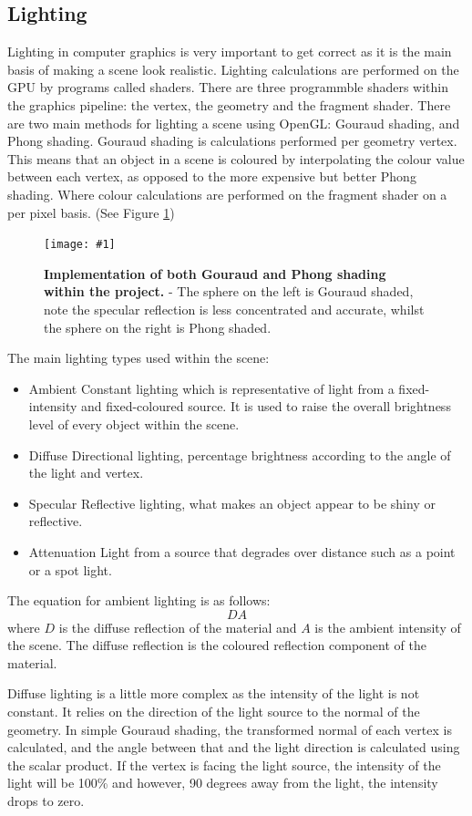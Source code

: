 \documentclass[conference]{acmsiggraph}
\newcommand{\figuremacroW}[4]{
\begin{figure}[h] %
	\centering
	\texttt{[image: \#1]}
	\caption[#2]{\textbf{#2} - #3}
	\label{fig:#1}
\end{figure}
}
\begin{document}
\subsection{Lighting}
Lighting in computer graphics is very important to get correct as it is the main basis of making a scene look realistic. Lighting calculations are performed on the GPU by programs called shaders. There are three programmble shaders within the graphics pipeline: the vertex, the geometry and the fragment shader.
There are two main methods for lighting a scene using OpenGL: Gouraud shading, and Phong shading.
Gouraud shading is %
calculations performed per geometry vertex. This means that an object in a scene is coloured by interpolating the colour value between each vertex, as opposed to the more expensive but better Phong shading. Where colour calculations are performed on the fragment shader on a per pixel basis. (See Figure \ref{fig:gouraudPhong})
	
\figuremacroW
{gouraudPhong}
{Implementation of both Gouraud and Phong shading within the project. }
{The sphere on the left is Gouraud shaded, note the specular reflection is less concentrated and accurate, whilst the sphere on the right is Phong shaded.}
{1.0}
	
The main lighting types used within the scene:
\begin{itemize}
	\item {Ambient} Constant lighting which is representative of light from a fixed-intensity and fixed-coloured source. It is used to raise the overall brightness level of every object within the scene. 
	\item {Diffuse} Directional lighting, percentage brightness according to the angle of the light and vertex.
	\item {Specular} Reflective lighting, what makes an object appear to be shiny or reflective.
	\item {Attenuation} Light from a source that degrades over distance such as a point or a spot light.
\end{itemize}
	
The equation for ambient lighting is as follows:
\begin{equation} \label{ambientLightingEq}
	DA
\end{equation}
where $D$ is the diffuse reflection of the material and $A$ is the ambient intensity of the scene. The diffuse reflection is the coloured reflection component of the material.
	
Diffuse lighting is a little more complex as the intensity of the light is not constant. It relies on the direction of the light source to the normal of the geometry. In simple Gouraud shading, the transformed normal of each vertex is calculated, and the angle between that and the light direction is calculated using the scalar product. If the vertex is facing the light source, the intensity of the light will be 100\% and however, 90 degrees away from the light, the intensity drops to zero.
	
\end{document}
